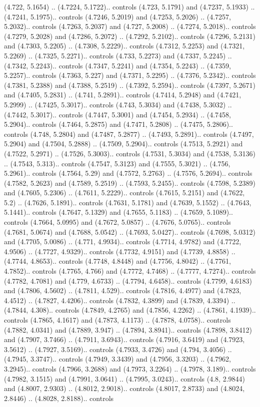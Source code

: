(4.722, 5.1654) .. (4.7224, 5.1722).. controls (4.723, 5.1791) and (4.7237, 5.1933) .. (4.7241, 5.1975).. controls (4.7246, 5.2019) and (4.7253, 5.2026) .. (4.7257, 5.2032).. controls (4.7263, 5.2037) and (4.727, 5.2008) .. (4.7274, 5.2018).. controls (4.7279, 5.2028) and (4.7286, 5.2072) .. (4.7292, 5.2102).. controls (4.7296, 5.2131) and (4.7303, 5.2205) .. (4.7308, 5.2229).. controls (4.7312, 5.2253) and (4.7321, 5.2269) .. (4.7325, 5.2271).. controls (4.733, 5.2273) and (4.7337, 5.2245) .. (4.7342, 5.2243).. controls (4.7347, 5.2241) and (4.7354, 5.2243) .. (4.7359, 5.2257).. controls (4.7363, 5.227) and (4.7371, 5.2295) .. (4.7376, 5.2342).. controls (4.7381, 5.2388) and (4.7388, 5.2519) .. (4.7392, 5.2594).. controls (4.7397, 5.2671) and (4.7405, 5.2831) .. (4.741, 5.2891).. controls (4.7414, 5.2948) and (4.7421, 5.2999) .. (4.7425, 5.3017).. controls (4.743, 5.3034) and (4.7438, 5.3032) .. (4.7442, 5.3017).. controls (4.7447, 5.3001) and (4.7454, 5.2934) .. (4.7458, 5.2904).. controls (4.7464, 5.2875) and (4.7471, 5.2808) .. (4.7475, 5.2806).. controls (4.748, 5.2804) and (4.7487, 5.2877) .. (4.7493, 5.2891).. controls (4.7497, 5.2904) and (4.7504, 5.2888) .. (4.7509, 5.2904).. controls (4.7513, 5.2921) and (4.7522, 5.2971) .. (4.7526, 5.3003).. controls (4.7531, 5.3034) and (4.7538, 5.3136) .. (4.7543, 5.313).. controls (4.7547, 5.3123) and (4.7555, 5.3021) .. (4.756, 5.2961).. controls (4.7564, 5.29) and (4.7572, 5.2763) .. (4.7576, 5.2694).. controls (4.7582, 5.2623) and (4.7589, 5.2519) .. (4.7593, 5.2455).. controls (4.7598, 5.2389) and (4.7605, 5.2306) .. (4.7611, 5.2229).. controls (4.7615, 5.2151) and (4.7622, 5.2) .. (4.7626, 5.1891).. controls (4.7631, 5.1781) and (4.7639, 5.1552) .. (4.7643, 5.1441).. controls (4.7647, 5.1329) and (4.7655, 5.1183) .. (4.7659, 5.1089).. controls (4.7664, 5.0995) and (4.7672, 5.0857) .. (4.7676, 5.0765).. controls (4.7681, 5.0674) and (4.7688, 5.0542) .. (4.7693, 5.0427).. controls (4.7698, 5.0312) and (4.7705, 5.0086) .. (4.771, 4.9934).. controls (4.7714, 4.9782) and (4.7722, 4.9506) .. (4.7727, 4.9329).. controls (4.7732, 4.9151) and (4.7739, 4.8858) .. (4.7744, 4.8653).. controls (4.7748, 4.8448) and (4.7756, 4.8042) .. (4.7761, 4.7852).. controls (4.7765, 4.766) and (4.7772, 4.7468) .. (4.7777, 4.7274).. controls (4.7782, 4.7081) and (4.779, 4.6733) .. (4.7794, 4.6458).. controls (4.7799, 4.6183) and (4.7806, 4.5602) .. (4.7811, 4.529).. controls (4.7816, 4.4977) and (4.7823, 4.4512) .. (4.7827, 4.4206).. controls (4.7832, 4.3899) and (4.7839, 4.3394) .. (4.7844, 4.308).. controls (4.7849, 4.2765) and (4.7856, 4.2262) .. (4.7861, 4.1939).. controls (4.7865, 4.1617) and (4.7873, 4.1173) .. (4.7878, 4.0758).. controls (4.7882, 4.0341) and (4.7889, 3.947) .. (4.7894, 3.8941).. controls (4.7898, 3.8412) and (4.7907, 3.7466) .. (4.7911, 3.6943).. controls (4.7916, 3.6419) and (4.7923, 3.5612) .. (4.7927, 3.5169).. controls (4.7933, 3.4726) and (4.794, 3.4056) .. (4.7945, 3.3747).. controls (4.7949, 3.3439) and (4.7956, 3.3203) .. (4.7962, 3.2945).. controls (4.7966, 3.2688) and (4.7973, 3.2264) .. (4.7978, 3.189).. controls (4.7982, 3.1515) and (4.7991, 3.0641) .. (4.7995, 3.0243).. controls (4.8, 2.9844) and (4.8007, 2.9303) .. (4.8012, 2.9018).. controls (4.8017, 2.8733) and (4.8024, 2.8446) .. (4.8028, 2.8188).. controls 